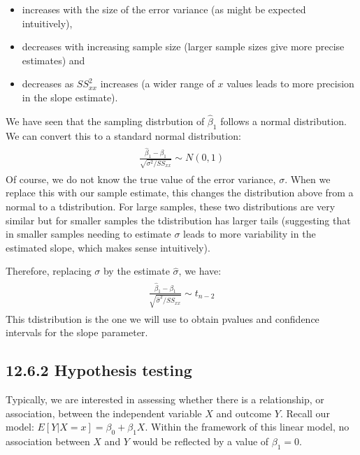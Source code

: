 \documentclass[letterpaper,10pt,english]{jupyterBook}
\begin{document}
\begin{itemize}
\item {} 
\sphinxAtStartPar
increases with the size of the error variance (as might be expected intuitively),

\item {} 
\sphinxAtStartPar
decreases with increasing sample size (larger sample sizes give more precise estimates) and

\item {} 
\sphinxAtStartPar
decreases as \({SS}_{xx}^2\) increases (a wider range of \(x\) values leads to more precision in the slope estimate).

\end{itemize}

\sphinxAtStartPar
We have seen that the sampling distrbution of \(\hat{\beta}_1\) follows a normal distribution. We can convert this to a standard normal distribution:
\begin{equation*}
\begin{split}
\begin{align}
\frac{\hat{\beta}_1 - \beta_1}{\sqrt{\sigma^2/SS_{xx}}} \sim N(0,1) 
\end{align}
\end{split}
\end{equation*}
\sphinxAtStartPar
Of course, we do not know the true value of the error variance, \(\sigma\). When we replace this with our sample estimate, this changes the distribution above from a normal to a t\sphinxhyphen{}distribution. For large samples, these two distributions are very similar but for smaller samples the t\sphinxhyphen{}distribution has larger tails (suggesting that in smaller samples needing to estimate \(\sigma\) leads to more variability in the estimated slope, which makes sense intuitively).

\sphinxAtStartPar
Therefore, replacing \(\sigma\) by the estimate \(\hat{\sigma}\), we have:
\begin{equation*}
\begin{split}
\begin{align}
\frac{\hat{\beta}_1 - \beta_1}{\sqrt{\hat{\sigma}^2/SS_{xx}}} \sim t_{n-2}
\end{align}
\end{split}
\end{equation*}
\sphinxAtStartPar
This t\sphinxhyphen{}distribution is the one we will use to obtain p\sphinxhyphen{}values and confidence intervals for the slope parameter.


\subsection{12.6.2 Hypothesis testing}
\label{\detokenize{12.g. Linear Regression I:hypothesis-testing}}
\sphinxAtStartPar
Typically, we are interested in assessing whether there is a relationship, or association, between the independent variable \(X\) and outcome \(Y\). Recall our model: \(E[Y | X=x] = \beta_0 + \beta_1 X\). Within the framework of this linear model, no association between \(X\) and \(Y\) would be reflected by a value of \(\beta_1 = 0\).
\end{document}
